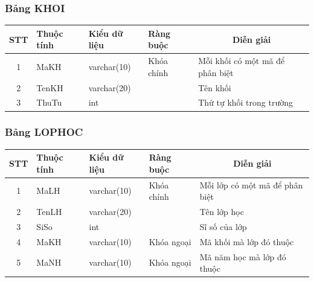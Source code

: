 \documentclass[a4paper]{article}
\begin{document}
\subsubsection{Bảng KHOI}
\begin{table}[H]
\centering
\renewcommand{\arraystretch}{1.5}
\setlength{\tabcolsep}{12pt}
\begin{tabular}{|c|l|l|l|p{5cm}|}
\hline
\textbf{STT} & \textbf{Thuộc tính} & \textbf{Kiểu dữ liệu} & \textbf{Ràng buộc} & \multicolumn{1}{|c|}{\textbf{Diễn giải}} \\
\hline
1 & MaKH & varchar(10) & Khóa chính & Mỗi khối có một mã để phân biệt \\
\hline
2 & TenKH & varchar(20) & & Tên khối \\
\hline
3 & ThuTu & int & & Thứ tự khối trong trường \\
\hline
\end{tabular}
\end{table}

\subsubsection{Bảng LOPHOC}
\begin{table}[H]
\centering
\renewcommand{\arraystretch}{1.5}
\setlength{\tabcolsep}{12pt}
\begin{tabular}{|c|l|l|l|p{5cm}|}
\hline
\textbf{STT} & \textbf{Thuộc tính} & \textbf{Kiểu dữ liệu} & \textbf{Ràng buộc} & \multicolumn{1}{|c|}{\textbf{Diễn giải}} \\
\hline
1 & MaLH & varchar(10) & Khóa chính & Mỗi lớp có một mã để phân biệt \\
\hline
2 & TenLH & varchar(20) & & Tên lớp học \\
\hline
3 & SiSo & int & & Sĩ số của lớp \\
\hline
4 & MaKH & varchar(10) & Khóa ngoại & Mã khối mà lớp đó thuộc \\
\hline
5 & MaNH & varchar(10) & Khóa ngoại & Mã năm học mà lớp đó thuộc \\
\hline
\end{tabular}
\end{table}
\end{document}
